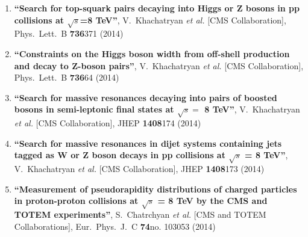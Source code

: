 \begin{enumerate}
\item%
{\bf ``Search for top-squark pairs decaying into Higgs or Z bosons in pp collisions at $\sqrt{s}$=8 TeV''}, 
  V.~Khachatryan {\it et al.}  [CMS Collaboration], 
Phys.\ Lett.\ B {\bf 736}371 (2014) %


\item%
{\bf ``Constraints on the Higgs boson width from off-shell production and decay to Z-boson pairs''}, 
  V.~Khachatryan {\it et al.}  [CMS Collaboration], 
Phys.\ Lett.\ B {\bf 736}64 (2014) %


\item%
{\bf ``Search for massive resonances decaying into pairs of boosted bosons in semi-leptonic final states at $\sqrt{s} =$ 8 TeV''}, 
  V.~Khachatryan {\it et al.}  [CMS Collaboration], 
JHEP {\bf 1408}174 (2014) %


\item%
{\bf ``Search for massive resonances in dijet systems containing jets tagged as W or Z boson decays in pp collisions at $ \sqrt{s} $ = 8 TeV''}, 
  V.~Khachatryan {\it et al.}  [CMS Collaboration], 
JHEP {\bf 1408}173 (2014) %


\item%
{\bf ``Measurement of pseudorapidity distributions of charged particles in proton-proton collisions at $\sqrt{s}$ = 8 TeV by the CMS and TOTEM experiments''}, 
  S.~Chatrchyan {\it et al.}  [CMS and TOTEM Collaborations], 
Eur.\ Phys.\ J.\ C {\bf 74}no. 103053 (2014) %



\end{enumerate}
